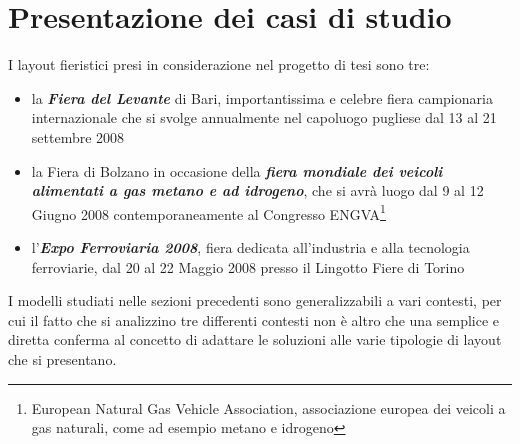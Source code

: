 \documentclass[12pt,a4paper,openright,twoside]{report}
\begin{document}
\section{Presentazione dei casi di studio}
I layout fieristici presi in considerazione nel progetto di tesi sono tre:
\begin{itemize}
\item la \textbf{\textit{Fiera del Levante}} di Bari, importantissima e celebre fiera campionaria internazionale che si svolge annualmente nel capoluogo pugliese dal 13 al 21 settembre 2008
\item la Fiera di Bolzano in occasione della \textbf{\textit{fiera mondiale dei veicoli alimentati a gas metano e ad idrogeno}}, che si avr\`{a} luogo dal 9 al 12 Giugno 2008 contemporaneamente al Congresso ENGVA\footnote{European Natural Gas Vehicle Association, associazione europea dei veicoli a gas naturali, come ad esempio metano e idrogeno}
\item l'\textbf{\textit{Expo Ferroviaria 2008}}, fiera dedicata all'industria e alla tecnologia ferroviarie, dal 20 al 22 Maggio 2008 presso il Lingotto Fiere di Torino 
\end{itemize}
I modelli studiati nelle sezioni precedenti sono generalizzabili a vari contesti, per cui il fatto che si analizzino tre differenti contesti non \`{e} altro che una semplice e diretta conferma al concetto di adattare le soluzioni alle varie tipologie di layout che si presentano.
\end{document}
